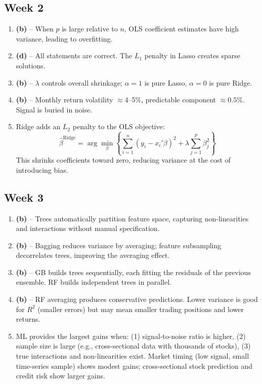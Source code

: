 \documentclass[11pt]{article}
\begin{document}
\subsection*{Week 2}

\begin{enumerate}[label=\textbf{\arabic*.}, leftmargin=*, itemsep=6pt, start=6]
  \item \textbf{(b)} -- When $p$ is large relative to $n$, OLS coefficient estimates have high variance, leading to overfitting.
  
  \item \textbf{(d)} -- All statements are correct. The $L_1$ penalty in Lasso creates sparse solutions.
  
  \item \textbf{(b)} -- $\lambda$ controls overall shrinkage; $\alpha = 1$ is pure Lasso, $\alpha = 0$ is pure Ridge.
  
  \item \textbf{(b)} -- Monthly return volatility $\approx 4$--5\%, predictable component $\approx 0.5\%$. Signal is buried in noise.
  
  \item Ridge adds an $L_2$ penalty to the OLS objective:
  \[
  \widehat{\beta}^{\text{Ridge}} = \arg\min_\beta \left\{ \sum_{i=1}^n (y_i - x_i'\beta)^2 + \lambda \sum_{j=1}^p \beta_j^2 \right\}
  \]
  This shrinks coefficients toward zero, reducing variance at the cost of introducing bias.
\end{enumerate}

\subsection*{Week 3}

\begin{enumerate}[label=\textbf{\arabic*.}, leftmargin=*, itemsep=6pt, start=11]
  \item \textbf{(b)} -- Trees automatically partition feature space, capturing non-linearities and interactions without manual specification.
  
  \item \textbf{(b)} -- Bagging reduces variance by averaging; feature subsampling decorrelates trees, improving the averaging effect.
  
  \item \textbf{(b)} -- GB builds trees sequentially, each fitting the residuals of the previous ensemble. RF builds independent trees in parallel.
  
  \item \textbf{(b)} -- RF averaging produces conservative predictions. Lower variance is good for $R^2$ (smaller errors) but may mean smaller trading positions and lower returns.
  
  \item ML provides the largest gains when: (1) signal-to-noise ratio is higher, (2) sample size is large (e.g., cross-sectional data with thousands of stocks), (3) true interactions and non-linearities exist. Market timing (low signal, small time-series sample) shows modest gains; cross-sectional stock prediction and credit risk show larger gains.
\end{enumerate}
\end{document}
